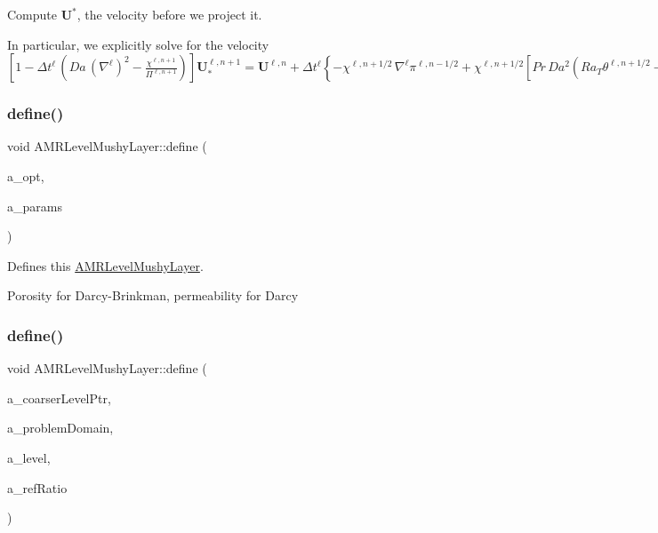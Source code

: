 Compute $ \mathbf{U}^* $, the velocity before we project it. 

In particular, we explicitly solve for the velocity $ \left[ 1 - \Delta t^\ell \, \left(Da \, \left(\nabla^\ell\right)^2 - \frac{\chi^{\ell, n+1}}{\Pi^{\ell, n+1}} \right) \right] \mathbf{U}^{\ell, n+1}_* = \mathbf{U}^{\ell, n} + \Delta t^\ell \left\{- \chi^{\ell, n+1/2} \, \nabla^\ell \pi^{\ell, n-1/2} + \chi^{\ell, n+1/2} \left[Pr \, Da^2 \left( Ra_T \theta^{\ell, n+1/2} - Ra_C \Theta^{\ell, n+1/2} \right) \right] - \mathbf{U}_{AD, CC}^{\ell, n+1/2} \cdot \nabla^\ell \left( \frac{\mathbf{U}}{\chi} \right)^{\ell, n+1/2} \right\}$ \mbox{\label{class_a_m_r_level_mushy_layer_a24f8ccde175e9273958d5511b525cdbb}} 
\subsubsection{\texorpdfstring{define()}{define()}\hspace{0.1cm}{\footnotesize\ttfamily [1/2]}}
{\footnotesize\ttfamily void A\+M\+R\+Level\+Mushy\+Layer\+::define (\begin{DoxyParamCaption}\item[{\hyperlink{struct_mushy_layer_options}{Mushy\+Layer\+Options}}]{a\+\_\+opt,  }\item[{\hyperlink{class_mushy_layer_params}{Mushy\+Layer\+Params}}]{a\+\_\+params }\end{DoxyParamCaption})}



Defines this \hyperlink{class_a_m_r_level_mushy_layer}{A\+M\+R\+Level\+Mushy\+Layer}. 

Porosity for Darcy-\/\+Brinkman, permeability for Darcy \mbox{\label{class_a_m_r_level_mushy_layer_a1ed163b80b24d3dc053097d24dc55be5}} 
\subsubsection{\texorpdfstring{define()}{define()}\hspace{0.1cm}{\footnotesize\ttfamily [2/2]}}
{\footnotesize\ttfamily void A\+M\+R\+Level\+Mushy\+Layer\+::define (\begin{DoxyParamCaption}\item[{\textbf{ A\+M\+R\+Level} $\ast$}]{a\+\_\+coarser\+Level\+Ptr,  }\item[{const \textbf{ Problem\+Domain} \&}]{a\+\_\+problem\+Domain,  }\item[{int}]{a\+\_\+level,  }\item[{int}]{a\+\_\+ref\+Ratio }\end{DoxyParamCaption})\hspace{0.3cm}{\ttfamily [virtual]}}



